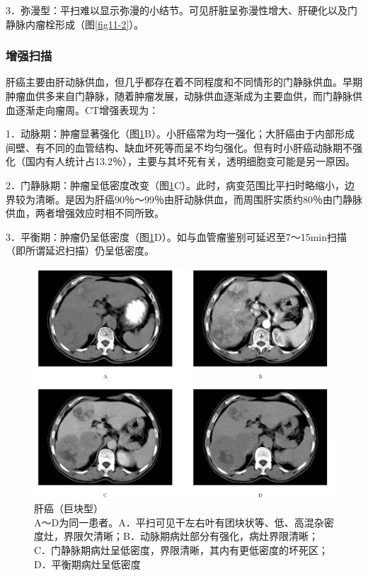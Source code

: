 3．弥漫型：平扫难以显示弥漫的小结节。可见肝脏呈弥漫性增大、肝硬化以及门静脉内瘤栓形成（图\ref{fig11-2}）。

\subsubsection{增强扫描}

肝癌主要由肝动脉供血，但几乎都存在着不同程度和不同情形的门静脉供血。早期肿瘤血供多来自门静脉，随着肿瘤发展，动脉供血逐渐成为主要血供，而门静脉供血逐渐走向瘤周。CT增强表现为：

1．动脉期：肿瘤显著强化（图\ref{fig11-1}B）。小肝癌常为均一强化；大肝癌由于内部形成间壁、有不同的血管结构、缺血坏死等而呈不均匀强化。但有时小肝癌动脉期不强化（国内有人统计占13.2％），主要与其坏死有关，透明细胞变可能是另一原因。

2．门静脉期：肿瘤呈低密度改变（图\ref{fig11-1}C）。此时，病变范围比平扫时略缩小，边界较为清晰。是因为肝癌90％～99％由肝动脉供血，而周围肝实质约80％由门静脉供血，两者增强效应时相不同所致。

3．平衡期：肿瘤仍呈低密度（图\ref{fig11-1}D）。如与血管瘤鉴别可延迟至7～15min扫描（即所谓延迟扫描）仍呈低密度。

\begin{figure}[!htbp]
 \centering
 \includegraphics[width=.7\textwidth,height=\textheight,keepaspectratio]{./images/Image00272.jpg}
 \captionsetup{justification=centering}
 \caption{肝癌（巨块型）\\{\small A～D为同一患者。A．平扫可见干左右叶有团块状等、低、高混杂密度灶，界限欠清晰；B．动脉期病灶部分有强化，病灶界限清晰；C．门静脉期病灶呈低密度，界限清晰，其内有更低密度的坏死区；D．平衡期病灶呈低密度}}
 \label{fig11-1}
  \end{figure} 

